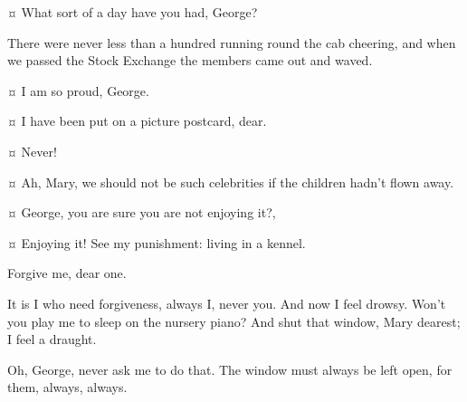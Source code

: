\begin{drama}
\mrsdarlingspeaks {}¤
What sort of a day have you had, George?


\mrdarlingspeaks
There were never less than a hundred running round the cab cheering,
and when we passed the Stock Exchange the members came out and waved.


\mrsdarlingspeaks {}¤
I am so proud, George.

\mrdarlingspeaks {}¤
I have been put on a picture postcard, dear.

\mrsdarlingspeaks {}¤
Never!

\mrdarlingspeaks {}¤
Ah, Mary, we should not be such celebrities if the children hadn’t flown away.

\mrsdarlingspeaks {}¤
George, you are sure you are not enjoying it?,

\mrdarlingspeaks {}¤
Enjoying it!
See my punishment: living in a kennel.

\mrsdarlingspeaks
Forgive me, dear one.

\mrdarlingspeaks
It is I who need forgiveness, always I, never you.
And now I feel drowsy.
Won’t you play me to sleep on the nursery piano?
And shut that window, Mary dearest; I feel a draught.

\mrsdarlingspeaks
Oh, George, never ask me to do that.
The window must always be left open, for them, always, always.



\end{drama}
